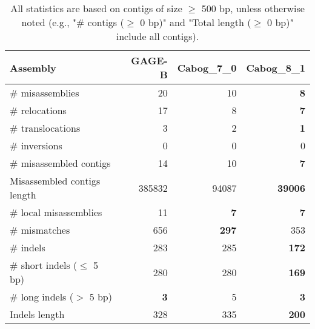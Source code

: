 \documentclass[12pt,a4paper]{article}
\begin{document}
\begin{table}[ht]
\begin{center}
\caption{All statistics are based on contigs of size $\geq$ 500 bp, unless otherwise noted (e.g., "\# contigs ($\geq$ 0 bp)" and "Total length ($\geq$ 0 bp)" include all contigs).}
\begin{tabular}{|l*{3}{|r}|}
\hline
Assembly & GAGE-B & Cabog\_7\_0 & Cabog\_8\_1 \\ \hline
\# misassemblies & 20 & 10 & {\bf 8} \\ \hline
\hspace{5mm}\# relocations & 17 & 8 & {\bf 7} \\ \hline
\hspace{5mm}\# translocations & 3 & 2 & {\bf 1} \\ \hline
\hspace{5mm}\# inversions & 0 & 0 & 0 \\ \hline
\# misassembled contigs & 14 & 10 & {\bf 7} \\ \hline
Misassembled contigs length & 385832 & 94087 & {\bf 39006} \\ \hline
\# local misassemblies & 11 & {\bf 7} & {\bf 7} \\ \hline
\# mismatches & 656 & {\bf 297} & 353 \\ \hline
\# indels & 283 & 285 & {\bf 172} \\ \hline
\hspace{5mm}\# short indels ($\leq$ 5 bp) & 280 & 280 & {\bf 169} \\ \hline
\hspace{5mm}\# long indels ($>$ 5 bp) & {\bf 3} & 5 & {\bf 3} \\ \hline
Indels length & 328 & 335 & {\bf 200} \\ \hline
\end{tabular}
\end{center}
\end{table}
\end{document}
